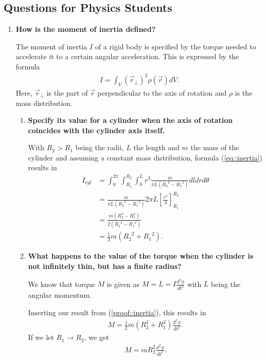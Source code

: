 \subsection{Questions for Physics Students}
\begin{enumerate}
	\item \textbf{How is the moment of inertia defined?}
	
	The moment of inertia $I$ of a rigid body is specified by the torque needed to accelerate it to a certain angular acceleration. This is expressed by the formula
	\begin{align}
		I = \int_{V} (\vec{r}_\perp)^2 \rho (\vec{r}) dV.
		\label{eq::inertia}
	\end{align}
	Here, $\vec{r}_\perp$ is the part of $\vec{r}$ perpendicular to the axis of rotation and $\rho$ is the mass distribution.
	
	\begin{enumerate}
		\item 
		\textbf{Specify its value for a cylinder when the axis of rotation coincides with the cylinder axis itself.}
		
	 	With $R_2 > R_1$ being the radii, $L$ the length and $m$ the mass of the cylinder and assuming a constant mass distribution, formula (\ref{eq::inertia}) results in
		\begin{align}
			I_{cyl}{}
			&=\int_{0}^{2 \pi} \int_{R_1}^{R_2} \int_{0}^{L} r^3 \frac{m}{\pi L ({R_2}^2 - {R_1}^2)} dl dr d\theta \\
			&= \frac{m}{\pi L ({R_2}^2 - {R_1}^2)} 2 \pi L \left[ \frac{r^4}{4}\right]_{R_1}^{R_2} \\
			&= \frac{m (R_2^4-R_1^4)}{2 ({R_2}^2 - {R_1}^2)} \\
			&= \frac{1}{2}m({R_2}^2 + {R_1}^2).
			\label{proof::inertia}
		\end{align}

	 	
 		\item
 		\textbf{What happens to the value of the torque when the cylinder is not infinitely thin, but has a finite radius?}
 		
 		We know that torque $M$ is given as $M = \dot{L} = I \frac{d^2 \phi}{d t^2}$ with $L$ being the angular momentum.
 		
 		Inserting our result from (\ref{proof::inertia}), this results in
 		\begin{align*}
 			M = \frac{1}{2} m (R_2^2 + R_1^2) \frac{d^2 \phi}{d t^2}.
 		\end{align*}
 		If we let $R_1 \rightarrow R_2$, we get
 		\begin{align*}
 			M = m R_2^2 \frac{d^2 \phi}{d t^2}.
 		\end{align*}
 		

\end{enumerate}
\end{enumerate}
